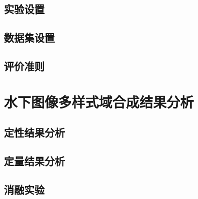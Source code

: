 \subsection{实验设置}

\subsection{数据集设置}

\subsection{评价准则}

\section{水下图像多样式域合成结果分析}
\subsection{定性结果分析}

\subsection{定量结果分析}


\subsection{消融实验}
